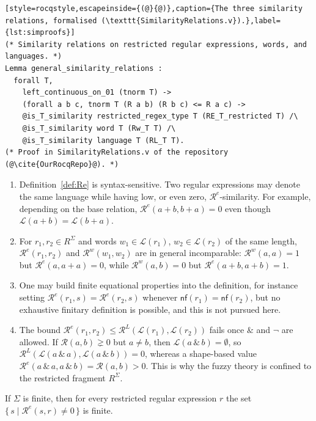 \begin{lstlisting}[style=rocqstyle,escapeinside={(@}{@)},caption={The three similarity relations, formalised (\texttt{SimilarityRelations.v}).},label={lst:simproofs}]
(* Similarity relations on restricted regular expressions, words, and languages. *)
Lemma general_similarity_relations :
  forall T,
    left_continuous_on_01 (tnorm T) ->
    (forall a b c, tnorm T (R a b) (R b c) <= R a c) ->
    @is_T_similarity restricted_regex_type T (RE_T_restricted T) /\
    @is_T_similarity word T (Rw_T T) /\
    @is_T_similarity language T (RL_T T).
(* Proof in SimilarityRelations.v of the repository (@\cite{OurRocqRepo}@). *)
\end{lstlisting}

\begin{remark}\label{rem:syntax-sensitive}\mbox{}
\begin{enumerate}
\item Definition~\ref{def:Re} is syntax-sensitive. Two regular expressions may
denote the same language while having low, or even zero, $\mathcal{R}^{e}$-similarity.
For example, depending on the base relation, $\mathcal{R}^{e}(a+b,b+a)=0$ even though
$\mathcal{L}(a+b)=\mathcal{L}(b+a)$.
\item For $r_1,r_2\in R^{\Sigma}$ and words $w_1\in\mathcal{L}(r_1)$,
$w_2\in\mathcal{L}(r_2)$ of the same length, $\mathcal{R}^{e}(r_1,r_2)$ and
$\mathcal{R}^{w}(w_1,w_2)$ are in general incomparable: $\mathcal{R}^{w}(a,a)=1$ but
$\mathcal{R}^{e}(a,a+a)=0$, while $\mathcal{R}^{w}(a,b)=0$ but
$\mathcal{R}^{e}(a+b,a+b)=1$.
\item One may build finite equational properties into the definition, for instance
setting $\mathcal{R}^{e}(r_1,s)=\mathcal{R}^{e}(r_2,s)$ whenever
$\mathsf{nf}(r_1)=\mathsf{nf}(r_2)$, but no exhaustive finitary definition is
possible, and this is not pursued here.
\item The bound $\mathcal{R}^{e}(r_1,r_2)\le\mathcal{R}^{L}(\mathcal{L}(r_1),\mathcal{L}(r_2))$
fails once $\&$ and $\neg$ are allowed. If
$\mathcal{R}(a,b)\gneq 0$ but $a\neq b$, then $\mathcal{L}(a\,\&\,b)=\emptyset$, so
$\mathcal{R}^{L}(\mathcal{L}(a\,\&\,a),\mathcal{L}(a\,\&\,b))=0$, whereas a
shape-based value $\mathcal{R}^{e}(a\,\&\,a,a\,\&\,b)=\mathcal{R}(a,b)>0$. This is
why the fuzzy theory is confined to the restricted fragment $R^{\Sigma}$.
\end{enumerate}
\end{remark}

\begin{lemma}\label{lem:finite-syntactic}
If $\Sigma$ is finite, then for every restricted regular expression $r$ the set
$\{\,s \mid \mathcal{R}^{e}(s,r)\neq 0\,\}$ is finite.
\end{lemma}

